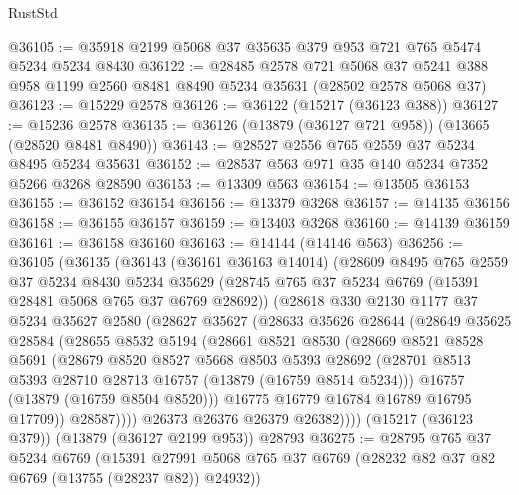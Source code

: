 \begin{lexlean}{RustStd}
\begin{coremodule}
@36105 := @35918 @2199 @5068 @37 @35635 @379 @953 @721 @765 @5474 @5234 @5234 @8430
@36122 := @28485
    @2578
    @721
    @5068
    @37
    @5241
    @388
    @958
    @1199
    @2560
    @8481
    @8490
    @5234
    @35631
    (@28502 @2578 @5068 @37)
@36123 := @15229 @2578
@36126 := @36122 (@15217 (@36123 @388))
@36127 := @15236 @2578
@36135 := @36126 (@13879 (@36127 @721 @958)) (@13665 (@28520 @8481 @8490))
@36143 := @28527 @2556 @765 @2559 @37 @5234 @8495 @5234 @35631
@36152 := @28537 @563 @971 @35 @140 @5234 @7352 @5266 @3268 @28590
@36153 := @13309 @563
@36154 := @13505 @36153
@36155 := @36152 @36154
@36156 := @13379 @3268
@36157 := @14135 @36156
@36158 := @36155 @36157
@36159 := @13403 @3268
@36160 := @14139 @36159
@36161 := @36158 @36160
@36163 := @14144 (@14146 @563)
@36256 := @36105
    (@36135
      (@36143
        (@36161 @36163 @14014)
        (@28609
          @8495
          @765
          @2559
          @37
          @5234
          @8430
          @5234
          @35629
          (@28745 @765 @37 @5234 @6769 (@15391 @28481 @5068 @765 @37 @6769 @28692))
          (@28618
            @330
            @2130
            @1177
            @37
            @5234
            @35627
            @2580
            (@28627
              @35627
              (@28633
                @35626
                @28644
                (@28649
                  @35625
                  @28584
                  (@28655
                    @8532
                    @5194
                    (@28661
                      @8521
                      @8530
                      (@28669
                        @8521
                        @8528
                        @5691
                        (@28679
                          @8520
                          @8527
                          @5668
                          @8503
                          @5393
                          @28692
                          (@28701 @8513 @5393 @28710 @28713 @16757 (@13879 (@16759 @8514 @5234)))
                          @16757
                          (@13879 (@16759 @8504 @8520)))
                        @16775
                        @16779
                        @16784
                        @16789
                        @16795
                        @17709))
                    @28587))))
            @26373
            @26376
            @26379
            @26382))))
    (@15217 (@36123 @379))
    (@13879 (@36127 @2199 @953))
    @28793
@36275 := @28795
    @765
    @37
    @5234
    @6769
    (@15391 @27991 @5068 @765 @37 @6769 (@28232 @82 @37 @82 @6769 (@13755 (@28237 @82)) @24932))

\end{coremodule}
\end{lexlean}
